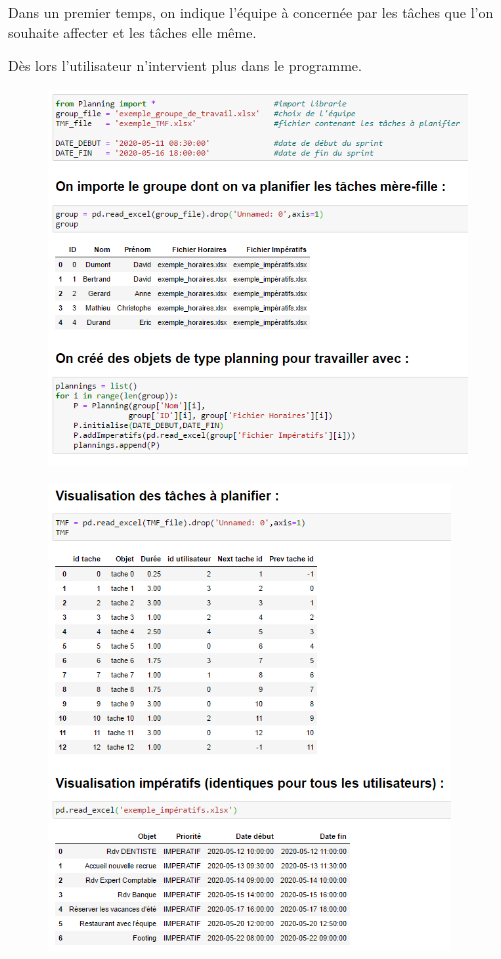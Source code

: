 \documentclass[12pt]{article}
\begin{document}
Dans un premier temps, on indique l'équipe à concernée par les tâches que l'on souhaite affecter et les tâches elle même.

Dès lors l'utilisateur n'intervient plus dans le programme.

\begin{figure}[H]
\begin{center}
\includegraphics[width=0.99\textwidth]{tmu1}
\end{center}
\end{figure}





\begin{figure}[H]
\begin{center}
\includegraphics[width=0.95\textwidth]{tmu2}
\end{center}
\end{figure}
\end{document}
